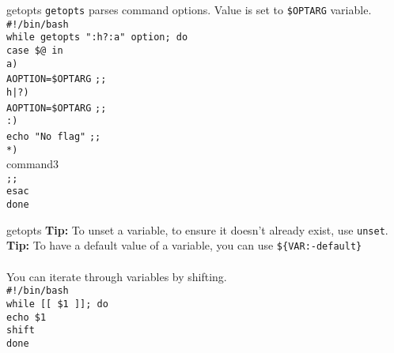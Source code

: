 \documentclass{beamer}
\let\tt\texttt
\let\bf\textbf
\begin{document}
\begin{frame}{getopts}
        \tt{getopts} parses command options. Value is set to \tt{\$OPTARG} variable. \\
        \tt{\#!/bin/bash}   \\
        \tt{while getopts ":h?:a" option; do}       \\
        \quad \tt{case \$@ in}                      \\
        \quad \quad \tt{a)}                         \\
        \quad \quad \quad \tt{AOPTION=\$OPTARG} \tt{;;} \\
        \quad \quad \tt{h|?)}                           \\
        \quad \quad \quad \tt{AOPTION=\$OPTARG} \tt{;;} \\
        \quad \quad \tt{:)}                             \\
        \quad \quad \quad \tt{echo "No flag"} \tt{;;}   \\
        \quad \quad \tt{*)}                         \\
        \quad \quad \quad command3                  \\
        \quad \quad \tt{;;}                         \\
        \quad \tt{esac}                             \\
        \tt{done}                                   \\
\end{frame}

\begin{frame}{getopts}
        \bf{Tip:} To unset a variable, to ensure it doesn't already exist, use \tt{unset}.      \\
        \bf{Tip:} To have a default value of a variable, you can use \tt{\$\{VAR:-default\}}    \\
        \quad                                           \\
        You can iterate through variables by shifting.  \\
        \tt{\#!/bin/bash}           \\
        \tt{while [[ \$1 ]]; do}    \\
        \quad \tt{echo \$1}         \\
        \quad \tt{shift}            \\
        \tt{done}                   \\
\end{frame}
\end{document}
